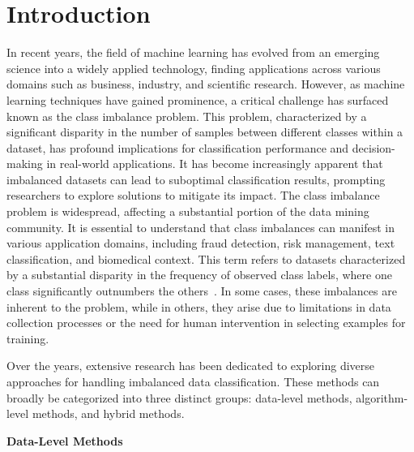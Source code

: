 \section{Introduction}

In recent years, the field of machine learning has evolved from an emerging science into a widely applied technology, finding applications across various domains such as business, industry, and scientific research. However, as machine learning techniques have gained prominence, a critical challenge has surfaced known as the class imbalance problem. This problem, characterized by a significant disparity in the number of samples between different classes within a dataset, has profound implications for classification performance and decision-making in real-world applications.
It has become increasingly apparent that imbalanced datasets can lead to suboptimal classification results, prompting researchers to explore solutions to mitigate its impact. The class imbalance problem is widespread, affecting a substantial portion of the data mining community. It is essential to understand that class imbalances can manifest in various application domains, including fraud detection, risk management, text classification, and biomedical context. This term refers to datasets characterized by a substantial disparity in the frequency of observed class labels, where one class significantly outnumbers the others~\cite{OBrien2019,Tarawneh2020}. In some cases, these imbalances are inherent to the problem, while in others, they arise due to limitations in data collection processes or the need for human intervention in selecting examples for training.
 
Over the years, extensive research has been dedicated to exploring diverse approaches for handling imbalanced data classification. These methods can broadly be categorized into three distinct groups: data-level methods, algorithm-level methods, and hybrid methods. 

\textbf{Data-Level Methods} 

